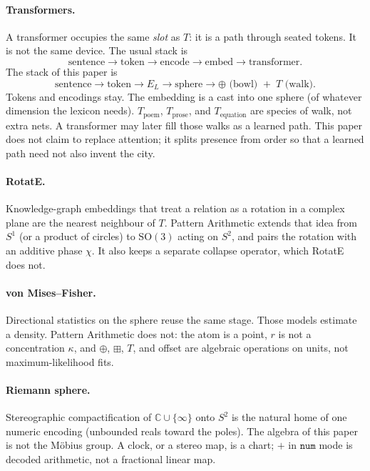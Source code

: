 \documentclass[12pt, a4paper]{article}
\begin{document}
\paragraph{Transformers.}
A transformer occupies the same \emph{slot} as $T$: it is a path
through seated tokens. It is not the same device. The usual stack is
\[
\text{sentence}\to\text{token}\to\text{encode}\to\text{embed}\to\text{transformer}.
\]
The stack of this paper is
\[
\text{sentence}\to\text{token}\to E_L\to\text{sphere}\to
\oplus\text{ (bowl) }+\; T\text{ (walk)}.
\]
Tokens and encodings stay. The embedding is a cast into one sphere
(of whatever dimension the lexicon needs). $T_{\mathrm{poem}}$,
$T_{\mathrm{prose}}$, and $T_{\mathrm{equation}}$ are species of
walk, not extra nets. A transformer may later fill those walks as a
learned path. This paper does not claim to replace attention; it
splits presence from order so that a learned path need not also
invent the city.

\paragraph{RotatE.}
Knowledge-graph embeddings that treat a relation as a rotation in a
complex plane are the nearest neighbour of $T$. Pattern Arithmetic
extends that idea from $S^1$ (or a product of circles) to
$\mathrm{SO}(3)$ acting on $S^2$, and pairs the rotation with an
additive phase $\chi$. It also keeps a separate collapse operator,
which RotatE does not.

\paragraph{von Mises--Fisher.}
Directional statistics on the sphere reuse the same stage.
Those models estimate a density. Pattern Arithmetic does not: the atom
is a point, $r$ is not a concentration $\kappa$, and $\oplus$, $\boxplus$, $T$, and
offset are algebraic operations on units, not maximum-likelihood fits.

\paragraph{Riemann sphere.}
Stereographic compactification of $\mathbb{C}\cup\{\infty\}$ onto $S^2$
is the natural home of one numeric encoding (unbounded reals toward the
poles). The algebra of this paper is not the M\"obius group. A clock,
or a stereo map, is a chart; $+$ in $\mathtt{num}$ mode is decoded
arithmetic, not a fractional linear map.
\end{document}
